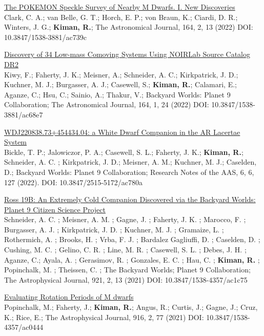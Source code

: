 \documentclass[10pt]{cv}
\begin{document}
\begin{llist}
\begin{etaremune}
  \item \href{https://ui.adsabs.harvard.edu/abs/2022AJ....164...33C/abstract}{The POKEMON Speckle Survey of Nearby M Dwarfs. I. New Discoveries}\\ Clark, C. A.; van Belle, G. T.; Horch, E. P.; von Braun, K.; Ciardi, D. R.; Winters, J. G.; \textbf{Kiman, R.}; The Astronomical Journal, 164, 2, 13 (2022) DOI: 10.3847/1538-3881/ac739c 
  
  \item \href{https://ui.adsabs.harvard.edu/abs/2022AJ....164....3K/abstract}{Discovery of 34 Low-mass Comoving Systems Using NOIRLab Source Catalog DR2}\\ Kiwy, F.; Faherty, J. K.; Meisner, A.; Schneider, A. C.; Kirkpatrick, J. D.; Kuchner, M. J.; Burgasser, A. J.; Casewell, S.; \textbf{Kiman, R.}; Calamari, E.; Aganze, C.; Hsu, C.; Sainio, A.; Thakur, V.; Backyard Worlds: Planet 9 Collaboration; The Astronomical Journal, 164, 1, 24 (2022) DOI: 10.3847/1538-3881/ac68e7

  \item \href{https://ui.adsabs.harvard.edu/abs/2022RNAAS...6..127B/abstract}{WDJ220838.73+454434.04: a White Dwarf Companion in the AR Lacertae System}\\ Bickle, T. P.; Jalowiczor, P. A.; Casewell, S. L.; Faherty, J. K.; \textbf{Kiman, R.}; Schneider, A. C. ; Kirkpatrick, J. D.; Meisner, A. M.; Kuchner, M. J.; Caselden, D.; Backyard Worlds: Planet 9 Collaboration; Research Notes of the AAS, 6, 6, 127 (2022). DOI: 10.3847/2515-5172/ac780a

  \item \href{https://ui.adsabs.harvard.edu/abs/2021arXiv210805321S/abstract}{Ross 19B: An Extremely Cold Companion Discovered via the Backyard Worlds: Planet 9 Citizen Science Project}\\ Schneider, A. C. ; Meisner, A. M. ; Gagne, J. ; Faherty, J. K. ; Marocco, F. ; Burgasser, A. J. ; Kirkpatrick, J. D. ; Kuchner, M. J. ; Gramaize, L. ; Rothermich, A. ; Brooks, H. ; Vrba, F. J. ; Bardalez Gagliuffi, D. ; Caselden, D. ; Cushing, M. C. ; Gelino, C. R. ; Line, M. R. ; Casewell, S. L. ; Debes, J. H. ; Aganze, C.; Ayala, A. ; Gerasimov, R. ; Gonzales, E. C. ; Hau, C. ; \textbf{Kiman, R.} ; Popinchalk, M. ; Theissen, C. ; The Backyard Worlds; Planet 9 Collaboration; The Astrophysical Journal, 921, 2, 13 (2021) DOI: 10.3847/1538-4357/ac1c75

  \item \href{https://ui.adsabs.harvard.edu/abs/2021ApJ...916...77P/abstract}{Evaluating Rotation Periods of M dwarfs}\\ Popinchalk, M.; Faherty, J.; \textbf{Kiman, R.}; Angus, R.; Curtis, J.; Gagne, J.; Cruz, K.; Rice, E.; The Astrophysical Journal, 916, 2, 77 (2021) DOI:  10.3847/1538-4357/ac0444


\end{etaremune}
\end{llist}
\end{document}
